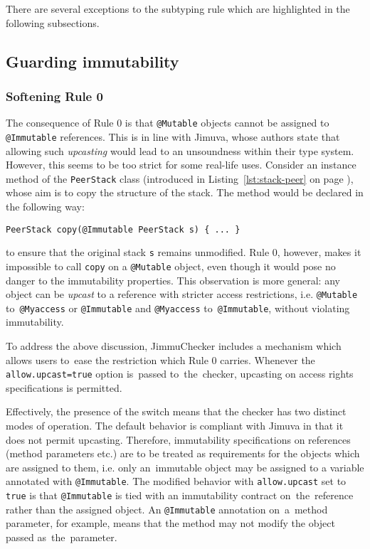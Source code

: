 \documentclass{pracamgr}
\theoremstyle{break}
\theoremstyle{break}
\theoremstyle{break}
\begin{document}
There are several exceptions to the subtyping rule which are
highlighted in the following subsections.

\subsection{Guarding immutability}

\subsubsection{Softening Rule 0}

The consequence of Rule 0 is that \texttt{@Mutable} objects cannot be
assigned to \texttt{@Immutable} re\-fe\-ren\-ces. This is in line with
Jimuva, whose authors state that allowing such \emph{upcasting} would
lead to an unsoundness within their type system. However, this seems
to be too strict for some real-life uses. Consider an instance method
of the \texttt{PeerStack} class (introduced in
Listing~\ref{lst:stack-peer} on page \pageref{lst:stack-peer}), whose
aim is to copy the structure of the stack. The method would be
declared in the following way:
\begin{lstlisting}
PeerStack copy(@Immutable PeerStack s) { ... }
\end{lstlisting}
to ensure that the original stack \texttt{s} remains unmodified. Rule
0, however, makes it impossible to call \texttt{copy} on a
\texttt{@Mutable} object, even though it would pose no danger to the
immutability properties. This observation is more general: any object
can be \emph{upcast} to a reference with stricter access restrictions,
i.e. \texttt{@Mutable} to~\texttt{@Myaccess} or \texttt{@Immutable}
and \texttt{@Myaccess} to~\texttt{@Immutable}, without violating
immutability.

To address the above discussion, JimmuChecker includes a mechanism
which allows users to~ease the restriction which Rule 0
carries. Whenever the \texttt{allow.upcast=true} option is~passed
to~the~checker, upcasting on access rights specifications is
permitted.

Effectively, the presence of the switch means that the checker has two
distinct modes of operation. The default behavior is compliant with
Jimuva in that it does not permit upcasting. Therefore, immutability
specifications on references (method parameters etc.) are to be
treated as requirements for the objects which are assigned to them,
i.e. only an~immutable object may be assigned to a variable annotated
with \texttt{@Immutable}. The modified behavior with
\texttt{allow.upcast} set to \texttt{true} is that \texttt{@Immutable}
is tied with an immutability contract on~the~reference rather than the
assigned object. An \texttt{@Immutable} annotation on~a~method
parameter, for example, means that the method may not modify the
object passed as~the~parameter.
\end{document}
